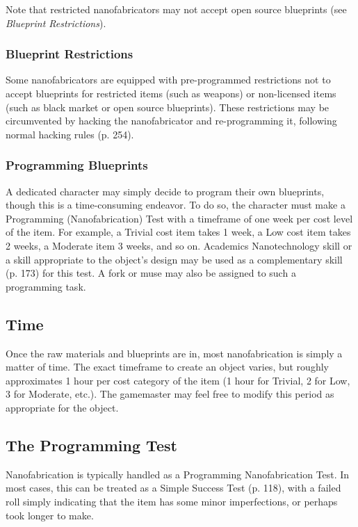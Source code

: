 Note that restricted nanofabricators may not accept 
open source blueprints (see \textit{Blueprint Restrictions}).

\subsubsection{Blueprint Restrictions}

Some nanofabricators are equipped with pre-programmed
restrictions not to accept blueprints for restricted
items (such as weapons) or non-licensed items
(such as black market or open source blueprints). 
These restrictions may be circumvented by hacking 
the nanofabricator and re-programming it, following 
normal hacking rules (p. 254).

\subsubsection{Programming Blueprints}

A dedicated character may simply decide to program 
their own blueprints, though this is a time-consuming 
endeavor. To do so, the character must make a Programming
(Nanofabrication) Test with a timeframe
of one week per cost level of the item. For example, a 
Trivial cost item takes 1 week, a Low cost item takes 2 
weeks, a Moderate item 3 weeks, and so on. Academics
Nanotechnology skill or a skill appropriate to the
object's design may be used as a complementary skill 
(p. 173) for this test. A fork or muse may also be assigned
to such a programming task.

\subsection{Time}

Once the raw materials and blueprints are in, most nanofabrication
is simply a matter of time. The exact timeframe to create an
object varies, but roughly approximates 1 hour per cost category of 
the item (1 hour for Trivial, 2 for Low, 3 for Moderate, etc.). The 
gamemaster may feel free to modify this period as appropriate for 
the object.

\subsection{The Programming Test}

Nanofabrication is typically handled as a Programming Nanofabrication
Test. In most cases, this can be treated as a Simple Success
Test (p. 118), with a failed roll simply indicating that the item has 
some minor imperfections, or perhaps took longer to make.

